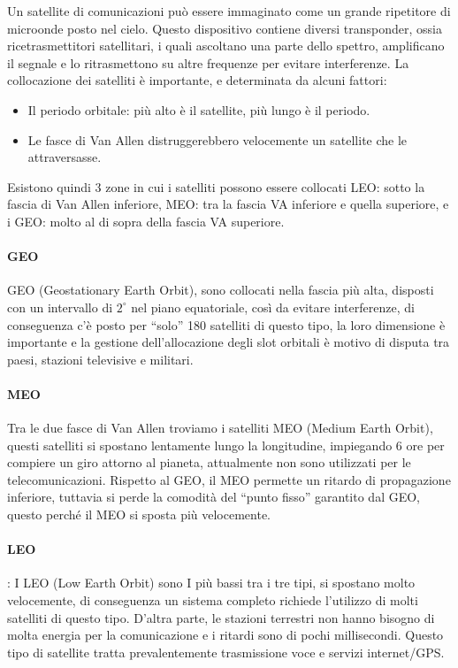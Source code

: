 Un satellite di comunicazioni può essere immaginato come un grande ripetitore di microonde posto nel cielo. Questo dispositivo contiene diversi transponder, ossia ricetrasmettitori satellitari, i quali ascoltano una parte dello spettro, amplificano il segnale e lo ritrasmettono su altre frequenze per evitare interferenze.
La collocazione dei satelliti è importante, e determinata da alcuni fattori:
\begin{itemize}
\item	Il periodo orbitale: più alto è il satellite, più lungo è il periodo.
\item	Le fasce di Van Allen distruggerebbero velocemente un satellite che le attraversasse.
\end{itemize}
Esistono quindi 3 zone in cui i satelliti possono essere collocati LEO: sotto la fascia di Van Allen inferiore, MEO: tra la fascia VA inferiore e quella superiore, e i GEO: molto al di sopra della fascia VA superiore.

 
\paragraph{GEO}
GEO (Geostationary Earth Orbit), sono collocati nella fascia più alta, disposti con un intervallo di $2^{\circ}$ nel piano equatoriale, così da evitare interferenze, di conseguenza c’è posto per “solo” 180 satelliti di questo tipo, la loro dimensione è importante e la gestione dell’allocazione degli slot orbitali è motivo di disputa tra paesi, stazioni televisive e militari.
\paragraph{MEO}
Tra le due fasce di Van Allen troviamo i satelliti MEO (Medium Earth Orbit), questi satelliti si spostano lentamente lungo la longitudine, impiegando 6 ore per compiere un giro attorno al pianeta, attualmente non sono utilizzati per le telecomunicazioni. Rispetto al GEO, il MEO permette un ritardo di propagazione inferiore, tuttavia si perde la comodità del “punto fisso” garantito dal GEO, questo perché il MEO si sposta più velocemente.
\paragraph{LEO}:
I LEO (Low Earth Orbit) sono I più bassi tra i tre tipi, si spostano molto velocemente, di conseguenza un sistema completo richiede l’utilizzo di molti satelliti di questo tipo. D’altra parte, le stazioni terrestri non hanno bisogno di molta energia per la comunicazione e i ritardi sono di pochi millisecondi.
Questo tipo di satellite tratta prevalentemente trasmissione voce e servizi internet/GPS. \\

